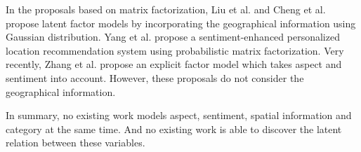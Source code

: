 In the proposals based on matrix factorization,
Liu et al. \cite{LiuBin:13} and Cheng et al. \cite{ChengYKL12}
propose latent factor models
by incorporating the geographical information using
Gaussian distribution.
Yang et al. \cite{YangSenti:2013}
propose a sentiment-enhanced personalized location recommendation
system using probabilistic matrix factorization.
Very recently, Zhang et al. \cite{ZhangYF14} propose an explicit factor model
which takes aspect and sentiment into account.
However, these proposals
do not consider the geographical information.


In summary, no existing work models aspect, sentiment, spatial
information and category at the same time. And no existing work is
able to discover the latent relation between these variables.
